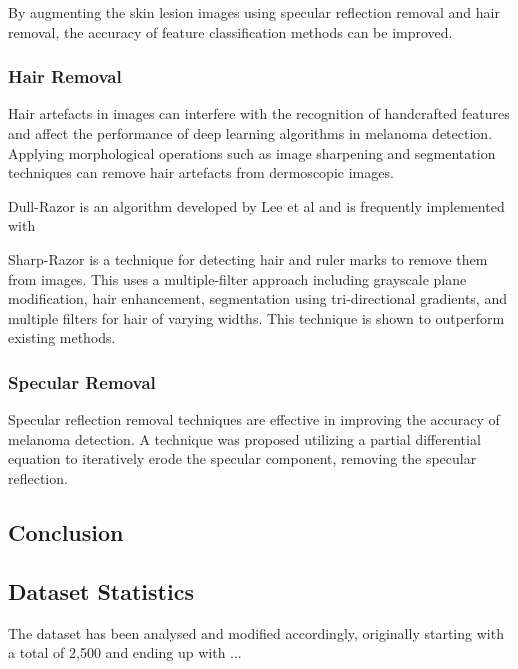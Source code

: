 By augmenting the skin lesion images using specular reflection removal and hair removal, the accuracy of feature classification methods can be improved\cite{kasmi2023}. 



\subsubsection{Hair Removal}
Hair artefacts in images can interfere with the recognition of handcrafted features and affect the performance of deep learning algorithms in melanoma detection\cite{kasmi2023}. Applying morphological operations such as image sharpening and segmentation techniques can remove hair artefacts from dermoscopic images\cite{kasmi2023}.

Dull-Razor is an algorithm developed by Lee et al\cite{Lee1997} and is frequently implemented with 

Sharp-Razor\cite{kasmi2023} is a technique for detecting hair and ruler marks to remove them from images. This uses a multiple-filter approach including grayscale plane modification, hair enhancement, segmentation using tri-directional gradients, and multiple filters for hair of varying widths. This technique is shown to outperform existing methods.

\subsubsection{Specular Removal}
Specular reflection removal techniques are effective in improving the accuracy of melanoma detection\cite{Shen2009}. A technique was proposed utilizing a partial differential equation to iteratively erode the specular component, removing the specular reflection\cite{Shen2009}.


\subsection{Conclusion}



\subsection{Dataset Statistics}
The dataset has been analysed and modified accordingly, originally starting with a total of 2,500 and ending up with ...

